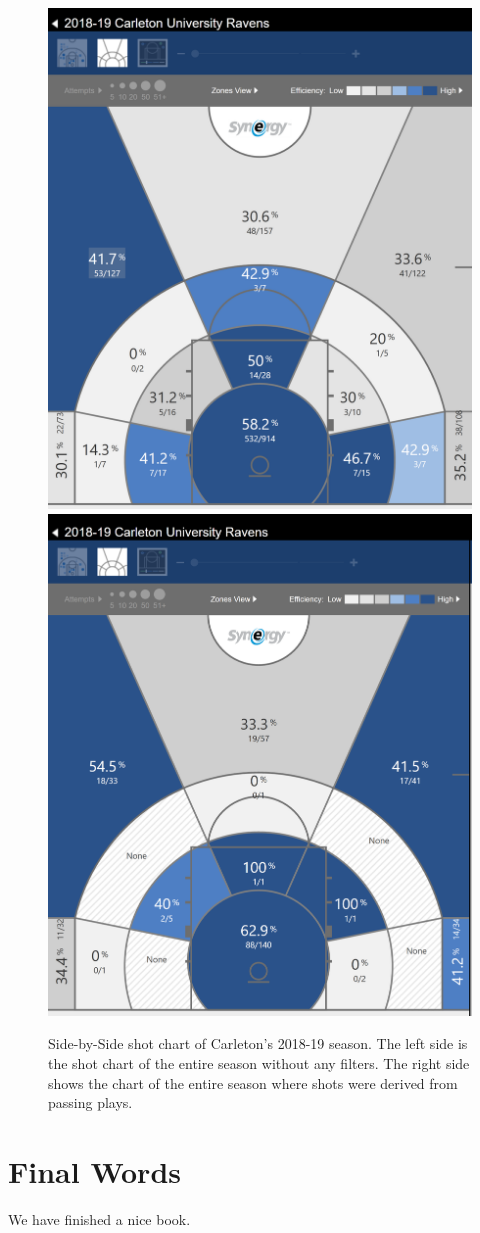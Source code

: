 \documentclass[]{book}
\begin{document}
\begin{figure}

{\centering \includegraphics[width=0.49\linewidth,height=0.5\textheight]{images/carl201819} \includegraphics[width=0.49\linewidth,height=0.5\textheight]{images/carleton201819pass} 

}

\caption{Side-by-Side shot chart of Carleton's 2018-19 season. The left side is the shot chart of the entire season without any filters. The right side shows the chart of the entire season where shots were derived from passing plays.}\label{fig:unnamed-chunk-63}
\end{figure}

\hypertarget{final-words}{%
\chapter{Final Words}\label{final-words}}

We have finished a nice book.


\end{document}
